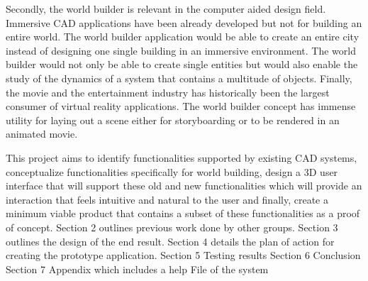 Secondly, the world builder is relevant in the computer aided design field. Immersive CAD applications have been already developed but not for
building an entire world. The world builder application would be able to create an entire city instead of designing one single building in an immersive 
environment. The world builder would not only be able to create single entities but would also enable the study of the dynamics of a system that contains
a multitude of objects. Finally, the movie and the entertainment industry has historically been the largest consumer of virtual reality 
applications. The world builder concept has immense utility for laying out a scene either for storyboarding or to be rendered in an animated movie.


This project aims to identify functionalities supported by existing CAD systems, conceptualize functionalities specifically for world building, design
a 3D user interface that will support these old and new functionalities which will provide an interaction that feels intuitive and natural to the user
and finally, create a minimum viable product that contains a subset of these functionalities as a proof of concept.
Section 2 outlines previous work done by other groups.  
Section 3 outlines the design of the end result.
Section 4 details the plan of action for creating the prototype application.
Section 5 Testing results
Section 6 Conclusion
Section 7 Appendix which includes a help File of the system
